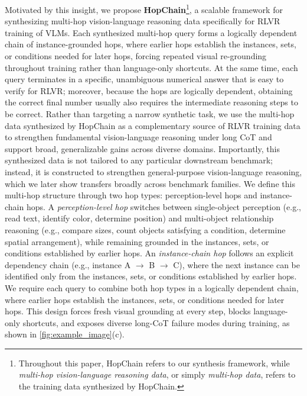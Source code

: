 Motivated by this insight, we propose \textbf{HopChain}\footnote{Throughout this paper, HopChain refers to our synthesis framework, while \emph{multi-hop vision-language reasoning data}, or simply \emph{multi-hop data}, refers to the training data synthesized by HopChain.}, a scalable framework for synthesizing multi-hop vision-language reasoning data specifically for RLVR training of VLMs.
Each synthesized multi-hop query forms a logically dependent chain of instance-grounded hops, where earlier hops establish the instances, sets, or conditions needed for later hops, forcing repeated visual re-grounding throughout training rather than language-only shortcuts.
At the same time, each query terminates in a specific, unambiguous numerical answer that is easy to verify for RLVR; moreover, because the hops are logically dependent, obtaining the correct final number usually also requires the intermediate reasoning steps to be correct.
Rather than targeting a narrow synthetic task, we use the multi-hop data synthesized by HopChain as a complementary source of RLVR training data to strengthen fundamental vision-language reasoning under long CoT and support broad, generalizable gains across diverse domains.
Importantly, this synthesized data is not tailored to any particular downstream benchmark; instead, it is constructed to strengthen general-purpose vision-language reasoning, which we later show transfers broadly across benchmark families.
We define this multi-hop structure through two hop types: perception-level hops and instance-chain hops.
A \emph{perception-level hop} switches between single-object perception (e.g., read text, identify color, determine position) and multi-object relationship reasoning (e.g., compare sizes, count objects satisfying a condition, determine spatial arrangement), while remaining grounded in the instances, sets, or conditions established by earlier hops.
An \emph{instance-chain hop} follows an explicit dependency chain (e.g., instance A $\rightarrow$ B $\rightarrow$ C), where the next instance can be identified only from the instances, sets, or conditions established by earlier hops.
We require each query to combine both hop types in a logically dependent chain, where earlier hops establish the instances, sets, or conditions needed for later hops.
This design forces fresh visual grounding at every step, blocks language-only shortcuts, and exposes diverse long-CoT failure modes during training, as shown in \cref{fig:example_image}(c).

